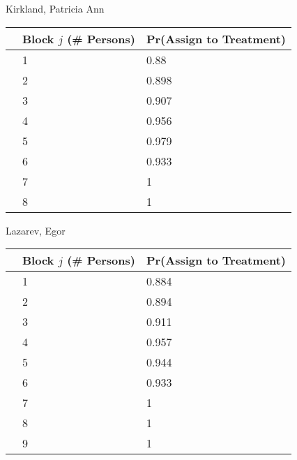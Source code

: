 \documentclass[11pt,notitlepage]{article}
\begin{document}
\begin{table}[h!]
\begin{center}

\begin{minipage}[t]{0.45\linewidth}\centering

Kirkland, Patricia Ann

\begin{tabular}{rll}
  \hline
 & Block $j$ (\# Persons) & Pr(Assign to Treatment) \\ 
  \hline
  & 1 & 0.88 \\ 
  & 2 & 0.898 \\ 
  & 3 & 0.907 \\ 
  & 4 & 0.956 \\ 
  & 5 & 0.979 \\ 
  & 6 & 0.933 \\ 
  & 7 & 1 \\ 
  & 8 & 1 \\ 
   \hline
\end{tabular}

\end{minipage}
\hspace{0.5cm}
\begin{minipage}[t]{0.45\linewidth}\centering

Lazarev, Egor

\begin{tabular}{rll}
  \hline
 & Block $j$ (\# Persons) & Pr(Assign to Treatment) \\ 
  \hline
 & 1 & 0.884 \\ 
 & 2 & 0.894 \\ 
 & 3 & 0.911 \\ 
 & 4 & 0.957 \\ 
 & 5 & 0.944 \\ 
 & 6 & 0.933 \\ 
 & 7 & 1 \\ 
 & 8 & 1 \\ 
 & 9 & 1 \\ 
   \hline
\end{tabular}


\end{minipage}

\end{center}
\end{table}
\end{document}
